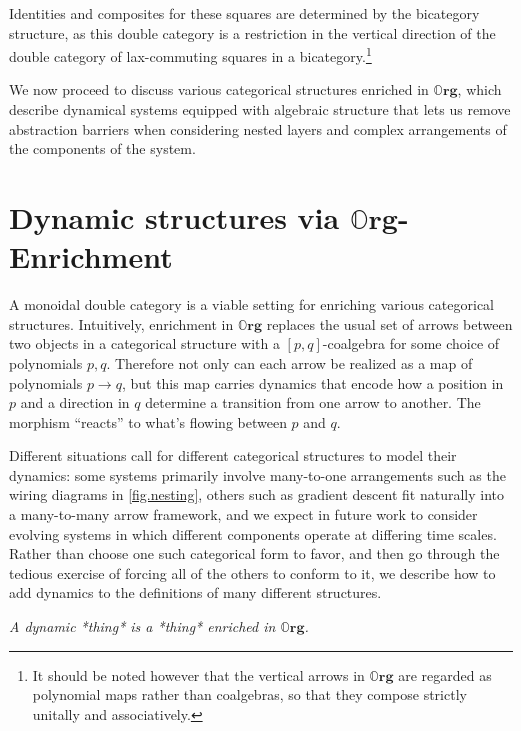 \documentclass{eptcs}
\theoremstyle{definition}
\theoremstyle{plain}
\newcommand{\Cat}[1]{\textbf{#1}}%
\newcommand{\0}{\textsf{0}}
\newcommand{\1}{\tn{\textsf{1}}}
\newcommand{\slogan}[1]{\begin{center}\textit{#1}\end{center}}
\newcommand{\org}{{\mathbb{O}\Cat{rg}}}
\begin{document}
Identities and composites for these squares are determined by the bicategory structure, as this double category is a restriction in the vertical direction of the double category of lax-commuting squares in a bicategory.\footnote{It should be noted however that the vertical arrows in $\org$ are regarded as polynomial maps rather than coalgebras, so that they compose strictly unitally and associatively.}

We now proceed to discuss various categorical structures enriched in $\org$, which describe dynamical systems equipped with algebraic structure that lets us remove abstraction barriers when considering nested layers and complex arrangements of the components of the system.


\section{Dynamic structures via $\org$-Enrichment}\label{chap.org_enrich}


A monoidal double category is a viable setting for enriching various categorical structures. Intuitively, enrichment in $\org$ replaces the usual set of arrows between two objects in a categorical structure with a $[p,q]$-coalgebra for some choice of polynomials $p,q$. Therefore not only can each arrow be realized as a map of polynomials $p \to q$, but this map carries dynamics that encode how a position in $p$ and a direction in $q$ determine a transition from one arrow to another. The morphism ``reacts'' to what's flowing between $p$ and $q$.

Different situations call for different categorical structures to model their dynamics: some systems primarily involve many-to-one arrangements such as the wiring diagrams in \cref{fig.nesting}, others such as gradient descent fit naturally into a many-to-many arrow framework, and we expect in future work to consider evolving systems in which different components operate at differing time scales. Rather than choose one such categorical form to favor, and then go through the tedious exercise of forcing all of the others to conform to it, we describe how to add dynamics to the definitions of many different structures.

\slogan{A dynamic *thing* is a *thing* enriched in $\org$.}
\end{document}
